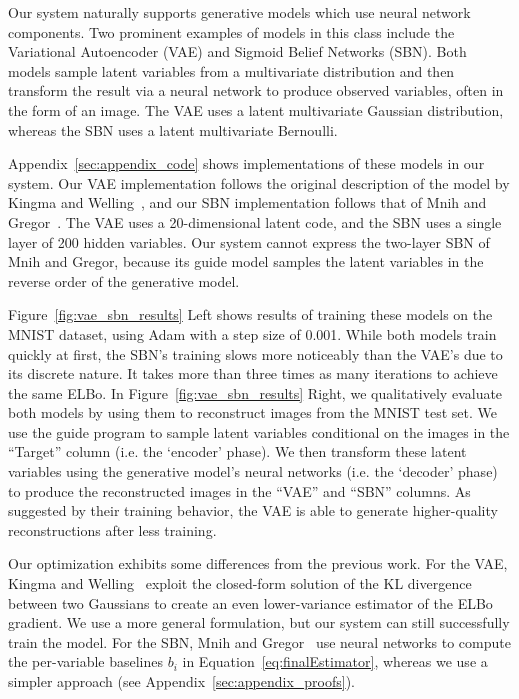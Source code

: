 Our system naturally supports generative models which use neural network components. Two prominent examples of models in this class include the Variational Autoencoder (VAE) and Sigmoid Belief Networks (SBN). Both models sample latent variables from a multivariate distribution and then transform the result via a neural network to produce observed variables, often in the form of an image. The VAE uses a latent multivariate Gaussian distribution, whereas the SBN uses a latent multivariate Bernoulli.

Appendix~\ref{sec:appendix_code} shows implementations of these models in our system. Our VAE implementation follows the original description of the model by Kingma and Welling~\cite{AEVB}, and our SBN implementation follows that of Mnih and Gregor~\cite{NVIL}.
The VAE uses a 20-dimensional latent code, and the SBN uses a single layer of 200 hidden variables. Our system cannot express the two-layer SBN of Mnih and Gregor, because its guide model samples the latent variables in the reverse order of the generative model.

Figure~\ref{fig:vae_sbn_results} Left shows results of training these models on the MNIST dataset, using Adam with a step size of 0.001.
While both models train quickly at first, the SBN's training slows more noticeably than the VAE's due to its discrete nature. It takes more than three times as many iterations to achieve the same ELBo.
In Figure~\ref{fig:vae_sbn_results} Right, we qualitatively evaluate both models by using them to reconstruct images from the MNIST test set. We use the guide program to sample latent variables conditional on the images in the ``Target'' column (i.e. the `encoder' phase). We then transform these latent variables using the generative model's neural networks (i.e. the `decoder' phase) to produce the reconstructed images in the ``VAE'' and ``SBN'' columns.
As suggested by their training behavior, the VAE is able to generate higher-quality reconstructions after less training.

Our optimization exhibits some differences from the previous work.
For the VAE, Kingma and Welling~\cite{AEVB} exploit the closed-form solution of the KL divergence between two Gaussians to create an even lower-variance estimator of the ELBo gradient. We use a more general formulation, but our system can still successfully train the model.
For the SBN, Mnih and Gregor~\cite{NVIL} use neural networks to compute the per-variable baselines $b_i$ in Equation~\ref{eq:finalEstimator}, whereas we use a simpler approach (see Appendix~\ref{sec:appendix_proofs}).

